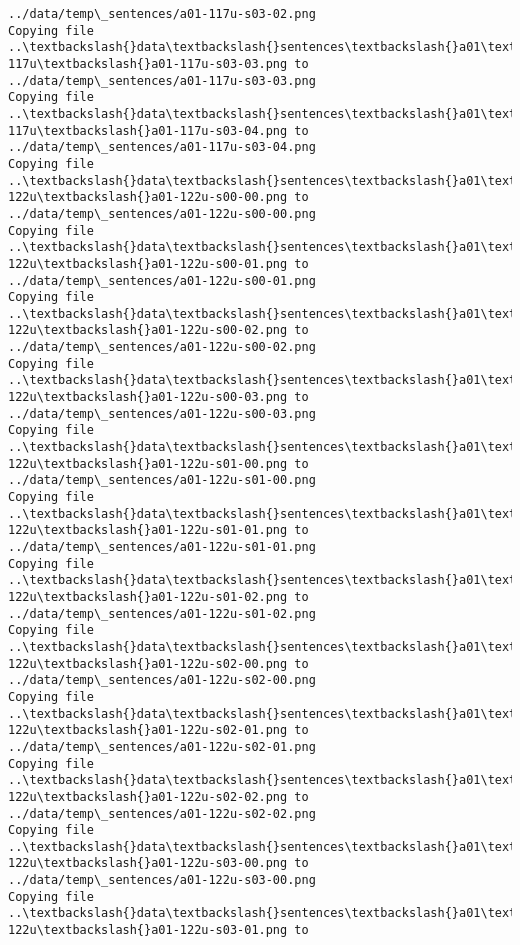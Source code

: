 \documentclass[11pt]{article}
\begin{document}
\begin{Verbatim}[commandchars=\\\{\}]
../data/temp\_sentences/a01-117u-s03-02.png
Copying file ..\textbackslash{}data\textbackslash{}sentences\textbackslash{}a01\textbackslash{}a01-117u\textbackslash{}a01-117u-s03-03.png to
../data/temp\_sentences/a01-117u-s03-03.png
Copying file ..\textbackslash{}data\textbackslash{}sentences\textbackslash{}a01\textbackslash{}a01-117u\textbackslash{}a01-117u-s03-04.png to
../data/temp\_sentences/a01-117u-s03-04.png
Copying file ..\textbackslash{}data\textbackslash{}sentences\textbackslash{}a01\textbackslash{}a01-122u\textbackslash{}a01-122u-s00-00.png to
../data/temp\_sentences/a01-122u-s00-00.png
Copying file ..\textbackslash{}data\textbackslash{}sentences\textbackslash{}a01\textbackslash{}a01-122u\textbackslash{}a01-122u-s00-01.png to
../data/temp\_sentences/a01-122u-s00-01.png
Copying file ..\textbackslash{}data\textbackslash{}sentences\textbackslash{}a01\textbackslash{}a01-122u\textbackslash{}a01-122u-s00-02.png to
../data/temp\_sentences/a01-122u-s00-02.png
Copying file ..\textbackslash{}data\textbackslash{}sentences\textbackslash{}a01\textbackslash{}a01-122u\textbackslash{}a01-122u-s00-03.png to
../data/temp\_sentences/a01-122u-s00-03.png
Copying file ..\textbackslash{}data\textbackslash{}sentences\textbackslash{}a01\textbackslash{}a01-122u\textbackslash{}a01-122u-s01-00.png to
../data/temp\_sentences/a01-122u-s01-00.png
Copying file ..\textbackslash{}data\textbackslash{}sentences\textbackslash{}a01\textbackslash{}a01-122u\textbackslash{}a01-122u-s01-01.png to
../data/temp\_sentences/a01-122u-s01-01.png
Copying file ..\textbackslash{}data\textbackslash{}sentences\textbackslash{}a01\textbackslash{}a01-122u\textbackslash{}a01-122u-s01-02.png to
../data/temp\_sentences/a01-122u-s01-02.png
Copying file ..\textbackslash{}data\textbackslash{}sentences\textbackslash{}a01\textbackslash{}a01-122u\textbackslash{}a01-122u-s02-00.png to
../data/temp\_sentences/a01-122u-s02-00.png
Copying file ..\textbackslash{}data\textbackslash{}sentences\textbackslash{}a01\textbackslash{}a01-122u\textbackslash{}a01-122u-s02-01.png to
../data/temp\_sentences/a01-122u-s02-01.png
Copying file ..\textbackslash{}data\textbackslash{}sentences\textbackslash{}a01\textbackslash{}a01-122u\textbackslash{}a01-122u-s02-02.png to
../data/temp\_sentences/a01-122u-s02-02.png
Copying file ..\textbackslash{}data\textbackslash{}sentences\textbackslash{}a01\textbackslash{}a01-122u\textbackslash{}a01-122u-s03-00.png to
../data/temp\_sentences/a01-122u-s03-00.png
Copying file ..\textbackslash{}data\textbackslash{}sentences\textbackslash{}a01\textbackslash{}a01-122u\textbackslash{}a01-122u-s03-01.png to

\end{Verbatim}
\end{document}
